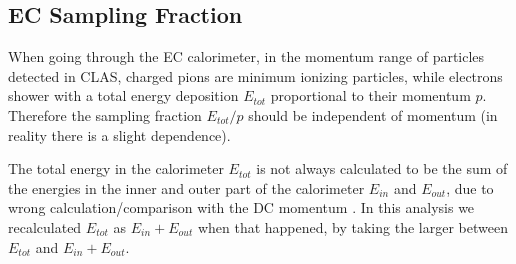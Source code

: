 \subsection{EC Sampling Fraction}
When going through the EC calorimeter, in the momentum range of particles detected in CLAS, 
charged pions are minimum ionizing particles, while electrons shower with a total energy 
deposition $E_{tot}$ proportional to their momentum $p$. 
Therefore the sampling fraction $E_{tot}/p$ should be independent of momentum (in reality there 
is a slight dependence).

The total energy in the calorimeter $E_{tot}$ is not always calculated to be the sum of the 
energies in the inner and outer part of the calorimeter $E_{in}$ and $E_{out}$, due to wrong 
calculation/comparison with the DC momentum \cite{bib:ectotmax}. In this analysis we
recalculated $E_{tot}$ as $E_{in}+E_{out}$ when that happened, by taking the larger
between $E_{tot}$ and $E_{in}+E_{out}$.

